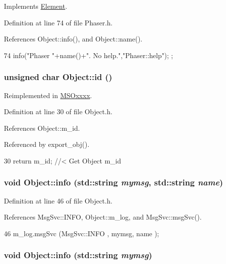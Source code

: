 Implements \hyperlink{classElement_a32c0de27acb08e17251cef88c3e9303a}{Element}.

Definition at line 74 of file Phaser.h.

References Object::info(), and Object::name().


\begin{DoxyCode}
74 { info("Phaser "+name()+". No help.","Phaser::help"); };
\end{DoxyCode}
\hypertarget{classObject_af99145335cc61ff6e2798ea17db009d2}{
\subsubsection[{id}]{\setlength{\rightskip}{0pt plus 5cm}unsigned char Object::id ()}}
\label{classObject_af99145335cc61ff6e2798ea17db009d2}


Reimplemented in \hyperlink{classMSOxxxx_a0f14b23d31d8e7647184e99a89600cc3}{MSOxxxx}.

Definition at line 30 of file Object.h.

References Object::m\_\-id.

Referenced by export\_\-obj().


\begin{DoxyCode}
30 { return m_id;         } //< Get Object m_id 
\end{DoxyCode}
\hypertarget{classObject_a1ca123253dfd30fc28b156f521dcbdae}{
\subsubsection[{info}]{\setlength{\rightskip}{0pt plus 5cm}void Object::info (std::string {\em mymsg}, \/  std::string {\em name})}}
\label{classObject_a1ca123253dfd30fc28b156f521dcbdae}


Definition at line 46 of file Object.h.

References MsgSvc::INFO, Object::m\_\-log, and MsgSvc::msgSvc().


\begin{DoxyCode}
46 { m_log.msgSvc (MsgSvc::INFO    , mymsg, name ); }
\end{DoxyCode}
\hypertarget{classObject_a644fd329ea4cb85f54fa6846484b84a8}{
\subsubsection[{info}]{\setlength{\rightskip}{0pt plus 5cm}void Object::info (std::string {\em mymsg})}}
\label{classObject_a644fd329ea4cb85f54fa6846484b84a8}


